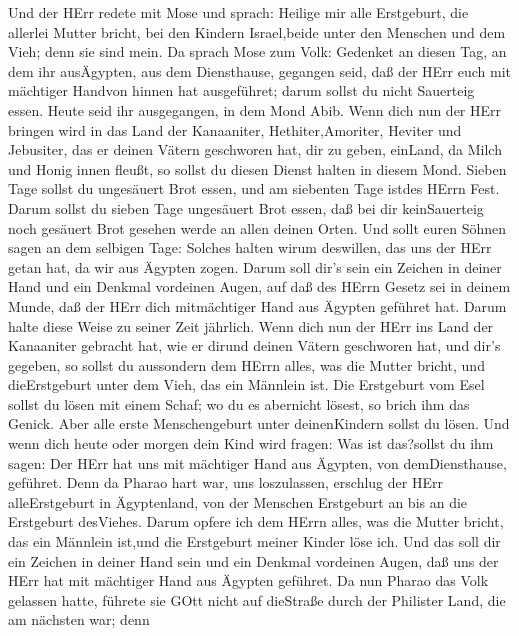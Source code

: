  Und der HErr redete mit Mose und sprach: 
Heilige mir alle Erstgeburt, die allerlei Mutter bricht, bei den Kindern
Israel,beide unter den Menschen und dem Vieh; denn sie sind mein.
 Da sprach Mose zum Volk: Gedenket an diesen Tag, an dem ihr
ausÄgypten, aus dem Diensthause, gegangen seid, daß der HErr euch mit
mächtiger Handvon hinnen hat ausgeführet; darum sollst du nicht
Sauerteig essen.  Heute seid ihr ausgegangen, in dem Mond
Abib.  Wenn dich nun der HErr bringen wird in das Land der
Kanaaniter, Hethiter,Amoriter, Heviter und Jebusiter, das er deinen
Vätern geschworen hat, dir zu geben, einLand, da Milch und Honig innen
fleußt, so sollst du diesen Dienst halten in diesem Mond. 
Sieben Tage sollst du ungesäuert Brot essen, und am siebenten Tage
istdes HErrn Fest.  Darum sollst du sieben Tage ungesäuert
Brot essen, daß bei dir keinSauerteig noch gesäuert Brot gesehen werde
an allen deinen Orten.  Und sollt euren Söhnen sagen an dem
selbigen Tage: Solches halten wirum deswillen, das uns der HErr getan
hat, da wir aus Ägypten zogen.  Darum soll dir's sein ein
Zeichen in deiner Hand und ein Denkmal vordeinen Augen, auf daß des
HErrn Gesetz sei in deinem Munde, daß der HErr dich mitmächtiger Hand
aus Ägypten geführet hat.  Darum halte diese Weise zu
seiner Zeit jährlich.  Wenn dich nun der HErr ins Land der
Kanaaniter gebracht hat, wie er dirund deinen Vätern geschworen hat, und
dir's gegeben,  so sollst du aussondern dem HErrn alles,
was die Mutter bricht, und dieErstgeburt unter dem Vieh, das ein
Männlein ist.  Die Erstgeburt vom Esel sollst du lösen mit
einem Schaf; wo du es abernicht lösest, so brich ihm das Genick. Aber
alle erste Menschengeburt unter deinenKindern sollst du lösen.
 Und wenn dich heute oder morgen dein Kind wird fragen: Was
ist das?sollst du ihm sagen: Der HErr hat uns mit mächtiger Hand aus
Ägypten, von demDiensthause, geführet.  Denn da Pharao hart
war, uns loszulassen, erschlug der HErr alleErstgeburt in Ägyptenland,
von der Menschen Erstgeburt an bis an die Erstgeburt desViehes. Darum
opfere ich dem HErrn alles, was die Mutter bricht, das ein Männlein
ist,und die Erstgeburt meiner Kinder löse ich.  Und das
soll dir ein Zeichen in deiner Hand sein und ein Denkmal vordeinen
Augen, daß uns der HErr hat mit mächtiger Hand aus Ägypten geführet.
 Da nun Pharao das Volk gelassen hatte, führete sie GOtt
nicht auf dieStraße durch der Philister Land, die am nächsten war; denn
